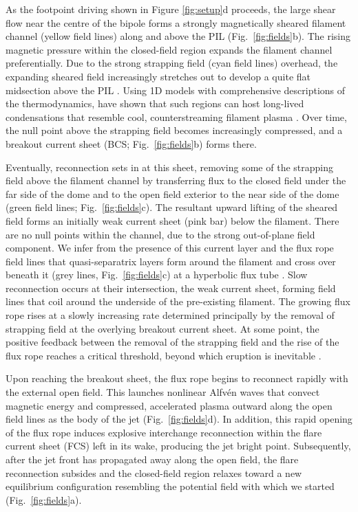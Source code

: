 \documentclass[twocolumn]{aastex6}
\begin{document}
As the footpoint driving shown in Figure \ref{fig:setup}d proceeds, the large shear flow near the centre of the bipole forms a strongly magnetically sheared filament channel (yellow field lines) along and above the PIL (Fig.\ \ref{fig:fields}b). The rising magnetic pressure within the closed-field region expands the filament channel preferentially. Due to the strong strapping field (cyan field lines) overhead, the expanding sheared field increasingly stretches out to develop a quite flat midsection above the PIL \citep[see also][]{Antiochos1994,DeVore2000,Aulanier2002,DeVore2008}. Using 1D models with comprehensive descriptions of the thermodynamics, \citet{Karpen2001,Karpen2005} have shown that such regions can host long-lived condensations that resemble cool, counterstreaming filament plasma \citep[see also][]{Luna2012}. Over time, the null point above the strapping field becomes increasingly compressed, and a breakout current sheet (BCS; Fig.\ \ref{fig:fields}b) forms there.

Eventually, reconnection sets in at this sheet, removing some of the strapping field above the filament channel by transferring flux to the closed field under the far side of the dome and to the open field exterior to the near side of the dome (green field lines; Fig.\ \ref{fig:fields}c). The resultant upward lifting of the sheared field forms an initially weak current sheet (pink bar) below the filament. There are no null points within the channel, due to the strong out-of-plane field component. We infer from the presence of this current layer and the flux rope field lines that quasi-separatrix layers \citep{Titov2007} form around the filament and cross over beneath it (grey lines, Fig.\ \ref{fig:fields}c) at a hyperbolic flux tube \citep{Titov2002}. Slow reconnection occurs at their intersection, the weak current sheet, forming field lines that coil around the underside of the pre-existing filament. The growing flux rope rises at a slowly increasing rate determined principally by the removal of strapping field at the overlying breakout current sheet. At some point, the positive feedback between the removal of the strapping field and the rise of the flux rope reaches a critical threshold, beyond which eruption is inevitable \citep{Antiochos1999,Karpen2012,Wyper2017}.

Upon reaching the breakout sheet, the flux rope begins to reconnect rapidly with the external open field. This launches nonlinear Alfv\'{e}n waves that convect magnetic energy and compressed, accelerated plasma outward along the open field lines as the body of the jet (Fig.\ \ref{fig:fields}d). In addition, this rapid opening of the flux rope induces explosive interchange reconnection within the flare current sheet (FCS) left in its wake, producing the jet bright point. Subsequently, after the jet front has propagated away along the open field, the flare reconnection subsides and the closed-field region relaxes toward a new equilibrium configuration resembling the potential field with which we started (Fig.\ \ref{fig:fields}a).
\end{document}
